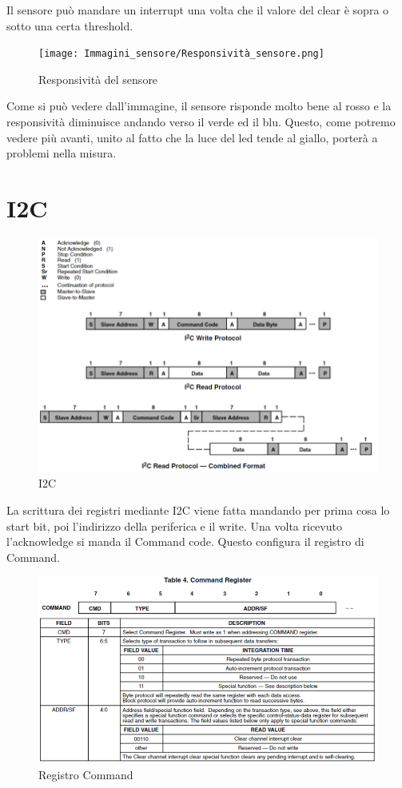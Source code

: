 \documentclass[12pt]{report}
\begin{document}
 Il sensore può mandare un interrupt una volta che il valore del clear è sopra o sotto una certa threshold.

\begin{figure}
\centering
    \texttt{[image: Immagini\_sensore/Responsività\_sensore.png]}
    \caption{Responsività del sensore}
\end{figure}

Come si può vedere dall'immagine, il sensore risponde molto bene al rosso e la responsività diminuisce andando verso il verde ed il blu. Questo, come potremo vedere più avanti, unito al fatto che la luce del led tende al giallo, porterà a problemi nella misura.

\section{I2C}

\begin{figure}
    \includegraphics[width=\textwidth]{Immagini_sensore/I2C.png}
    \caption{I2C}
\end{figure}

La scrittura dei registri mediante I2C viene fatta mandando per prima cosa lo start bit, poi l'indirizzo della periferica e il write. Una volta ricevuto l'acknowledge si manda il Command code. Questo configura il registro di Command.

\begin{figure}
    \includegraphics[width=\textwidth]{Immagini_sensore/registro_di_command.png}
    \caption{Registro Command}
    \label{fig:comm}
\end{figure}
\end{document}
